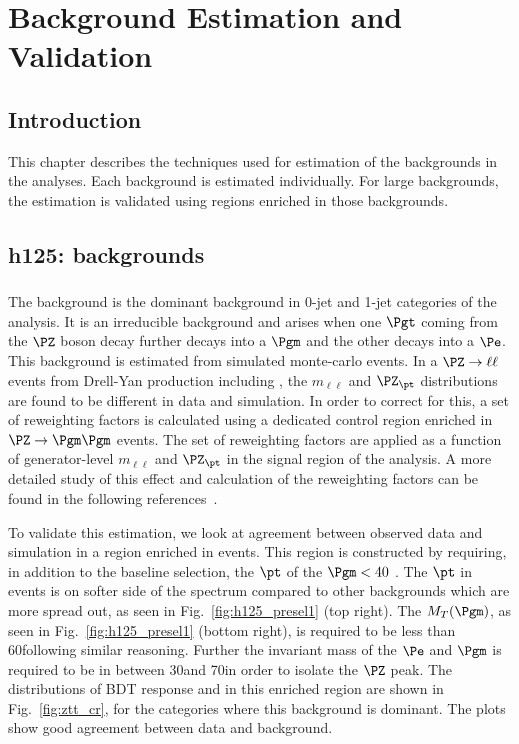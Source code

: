\chapter{Background Estimation and Validation}
\label{bg_val}
\section{Introduction}
This chapter describes the techniques used for estimation of the backgrounds in the analyses. Each background is estimated individually. For large backgrounds, the estimation is validated using regions enriched in those backgrounds.

\section{h125: \hmue backgrounds}
\label{h125_bg_val}

\subsection{\ztt}
\label{h125_ztt}
The \ztt background is the dominant background in 0-jet and 1-jet categories of the analysis. It is an irreducible background and arises when one $\Pgt$ coming from the $\PZ$ boson decay further decays into a $\Pgm$ and the other decays into a $\Pe$. This background is estimated from simulated monte-carlo events. In a $\PZ \to \ell \ell$ events from Drell-Yan production including \ztt, the $m_{\ell\ell}$ and $\PZ_{\pt}$ distributions are found to be different in data and simulation. In order to correct for this, a set of reweighting factors is calculated using a dedicated control region enriched in $\PZ \to \Pgm\Pgm$ events. The set of reweighting factors are applied as a function of generator-level $m_{\ell\ell}$ and $\PZ_{\pt}$ in the signal region of the analysis. A more detailed study of this effect and calculation of the reweighting factors can be found in the following references~\cite{CMS-PAS-HIG-16-043}.

To validate this estimation, we look at agreement between observed data and simulation in a region enriched in \ztt events. This region is constructed by requiring, in addition to the baseline selection,  the $\pt$ of the $\Pgm<40$ \GeV. The $\pt$ in \ztt events is on softer side of the spectrum compared to other backgrounds which are more spread out, as seen in Fig.~\ref{fig:h125_presel1} (top right). The $M_T(\Pgm)$, as seen in Fig.~\ref{fig:h125_presel1} (bottom right), is required to be less than 60\GeV following similar reasoning. Further the invariant mass of the $\Pe$ and $\Pgm$ is required to be in between 30\GeV and 70\GeV in order to isolate the $\PZ$ peak. The distributions of BDT response and \mcol in this \ztt enriched region are shown in Fig.~\ref{fig:ztt_cr}, for the categories where this background is dominant. The plots show good agreement between data and background.



